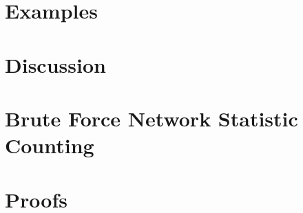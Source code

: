\documentclass[oneside]{myumnStatThesis}
\begin{document}
\chapter{Examples} \label{S:Examples}


\chapter{Discussion}
%


%

%

\appendix
\chapter{Brute Force Network Statistic Counting} \label{Section:Count Triangles}


\chapter{Proofs} \label{Section:Proofs}

\end{document}
